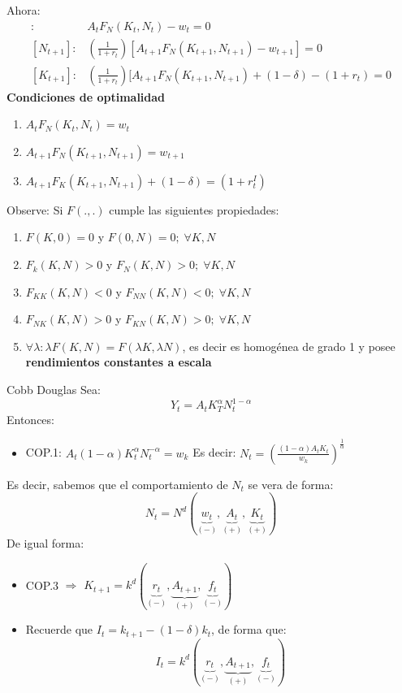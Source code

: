 \documentclass[12pt]{article}
\begin{document}
Ahora: 
\begin{align*}
    [N_t]:& A_tF_N(K_t,N_t)-w_t=0\\
    [N_{t+1}]: & (\frac{1}{1+r_t})[A_{t+1}F_N(K_{t+1},N_{t+1})-w_{t+1}]=0 \\
    [K_{t+1}]: & (\frac{1}{1+r_t})[A_{t+1}F_N(K_{t+1},N_{t+1})+(1-\delta)-(1+r_t)=0
\end{align*}
\textbf{Condiciones de optimalidad}
\begin{enumerate}
    \item $A_tF_N(K_t,N_t)=w_t$
    \item $A_{t+1}F_N(K_{t+1},N_{t+1})= w_{t+1}$
    \item $A_{t+1}F_K(K_{t+1},N_{t+1})+(1-\delta)= (1+r_t^I)$
\end{enumerate}

\begin{comentarioprofe}{Observe:}
    Si $F(.,.)$ cumple las siguientes propiedades: 
    \begin{enumerate}
        \item $F(K,0)=0$ y $F(0,N)=0;\; \forall K,N$
        \item $F_k(K,N)>0$ y $F_N(K,N)>0;\; \forall K,N$
        \item $F_{KK}(K,N)<0$ y $F_{NN}(K,N)<0; \; \forall K,N$
        \item $F_{NK}(K,N)>0$ y $F_{KN}(K,N)>0; \; \forall K,N$
        \item $\forall\lambda : \lambda F(K,N)=F(\lambda K,\lambda N)$, es decir es homogénea de grado 1 y posee \textbf{rendimientos constantes a escala}
    \end{enumerate}
\end{comentarioprofe}
\begin{ejemplo}{Cobb Douglas}
    Sea: 
    $$Y_t=A_tK_T^\alpha N_t^{1-\alpha}$$
    Entonces: 
    \begin{itemize}
        \item COP.1: $A_t(1-\alpha)K_t^\alpha N^{-\alpha}_t=w_k$
        Es decir: $N_t=(\frac{(1-\alpha)A_tK_t}{w_k})^\frac{1}{\alpha}$
    \end{itemize}
    Es decir, sabemos que el comportamiento de $N_t$ se vera de forma: $$N_t=N^d(\underbrace{w_t}_{(-)},\underbrace{A_t}_{(+)},\underbrace{K_t}_{(+)})$$
    De igual forma: 
    \begin{itemize}
        \item COP.3 $\Rightarrow{}$ $K_{t+1}=k^d(\underbrace{r_t}_{(-)},\underbrace{A_{t+1}}_{(+)},\underbrace{f_t}_{(-)})$
        \item Recuerde que $I_t=k_{t+1}-(1-\delta)k_t$, de forma que: $$I_t=k^d(\underbrace{r_t}_{(-)},\underbrace{A_{t+1}}_{(+)},\underbrace{f_t}_{(-)})$$
    \end{itemize}
\end{ejemplo}
\newpage
\end{document}
